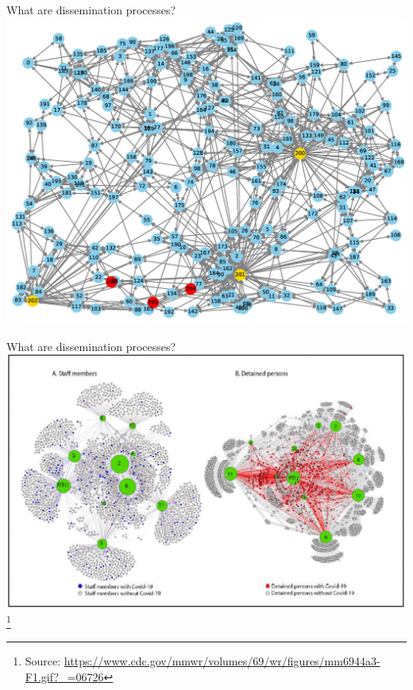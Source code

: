 \documentclass{beamer}
\newcommand{\sourcefootnote}[1]{\let\thefootnote\relax\footnote{{\tiny Source: \url{#1}}}}
\begin{document}
\begin{frame}{What are dissemination processes?}
  \centering
  \includegraphics[width=0.9\linewidth]{media/dissemination_process_graph.png}
  \cite{fakeNews}
\end{frame}
\begin{frame}{What are dissemination processes?}
  \includegraphics[width=\linewidth]{media/largeNetwork.png}
  \sourcefootnote{https://www.cdc.gov/mmwr/volumes/69/wr/figures/mm6944a3-F1.gif?_=06726}
\end{frame}
\end{document}
